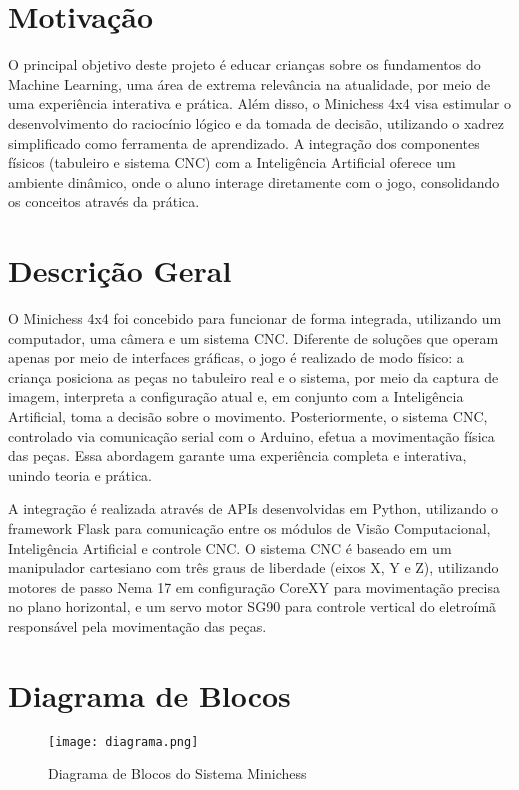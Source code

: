 \documentclass[a4paper,12pt]{article}
\begin{document}
\section{Motivação}
O principal objetivo deste projeto é educar crianças sobre os fundamentos do Machine Learning, uma área de extrema relevância na atualidade, por meio de uma experiência interativa e prática. Além disso, o Minichess 4x4 visa estimular o desenvolvimento do raciocínio lógico e da tomada de decisão, utilizando o xadrez simplificado como ferramenta de aprendizado. A integração dos componentes físicos (tabuleiro e sistema CNC) com a Inteligência Artificial oferece um ambiente dinâmico, onde o aluno interage diretamente com o jogo, consolidando os conceitos através da prática.

\section{Descrição Geral}
O Minichess 4x4 foi concebido para funcionar de forma integrada, utilizando um computador, uma câmera e um sistema CNC. Diferente de soluções que operam apenas por meio de interfaces gráficas, o jogo é realizado de modo físico: a criança posiciona as peças no tabuleiro real e o sistema, por meio da captura de imagem, interpreta a configuração atual e, em conjunto com a Inteligência Artificial, toma a decisão sobre o movimento. Posteriormente, o sistema CNC, controlado via comunicação serial com o Arduino, efetua a movimentação física das peças. Essa abordagem garante uma experiência completa e interativa, unindo teoria e prática. 

A integração é realizada através de APIs desenvolvidas em Python, utilizando o framework Flask para comunicação entre os módulos de Visão Computacional, Inteligência Artificial e controle CNC. O sistema CNC é baseado em um manipulador cartesiano com três graus de liberdade (eixos X, Y e Z), utilizando motores de passo Nema 17 em configuração CoreXY para movimentação precisa no plano horizontal, e um servo motor SG90 para controle vertical do eletroímã responsável pela movimentação das peças.

\section{Diagrama de Blocos}
\begin{figure}[H]
    \centering
    \texttt{[image: diagrama.png]} %
    \caption{Diagrama de Blocos do Sistema Minichess}
    \label{fig:diagrama}
\end{figure}
\end{document}
